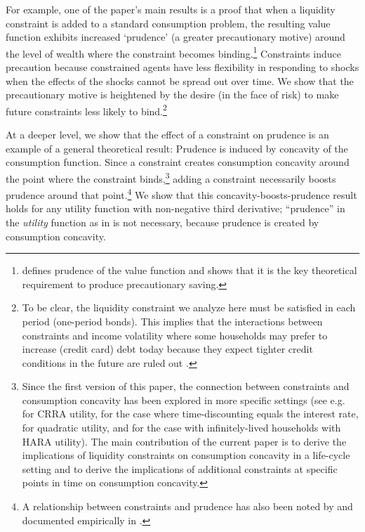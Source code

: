 \documentclass[titlepage]{\econtex}
\begin{document}
  For example, one of the paper's main results is a proof that when a liquidity constraint is added to a standard consumption problem, the resulting value function exhibits increased `prudence' (a greater precautionary motive) around the level of wealth where the constraint becomes binding.\footnote{\citet{kimball:smallandlarge} defines prudence of the value function and shows that it is the key theoretical requirement to produce precautionary saving.} Constraints induce precaution because constrained agents have less flexibility in responding to shocks when the effects of the shocks cannot be spread out over time. We show that the precautionary motive is heightened by the desire (in the face of risk) to make future constraints less likely to bind.\footnote{To be clear, the liquidity constraint we analyze here must be satisfied in each period (one-period bonds). This implies that the interactions between constraints and income volatility where some households may prefer to increase (credit card) debt today because they expect tighter credit conditions in the future are ruled out \citep{fulford2015important,druedahl2018precautionary}.} 

  At a deeper level, we show that the effect of a constraint on prudence is an example of a general theoretical result: Prudence is induced by concavity of the consumption function. Since a constraint creates consumption concavity around the point where the constraint binds,\footnote{Since the first version of this paper, the connection between constraints and consumption concavity has been explored in more specific settings (see e.g. \citet{park2006analytical} for CRRA utility,  \citet{seater1997optimal} for the case where time-discounting equals the interest rate, \citet{nishiyama2012concavity} for quadratic utility, and \citet{holm2018consumption} for the case with infinitely-lived households with HARA utility). The main contribution of the current paper is to derive the implications of liquidity constraints on consumption concavity in a life-cycle setting and to derive the implications of additional constraints at specific points in time on consumption concavity.} adding a constraint necessarily boosts prudence around that point.\footnote{A relationship between constraints and prudence has also been noted by \citet{lee2007degree} and documented empirically in \citet{lee2010precautionary}.} We show that this concavity-boosts-prudence result holds for any utility function with non-negative third derivative; ``prudence'' in the \textit{utility} function as in  \citet{kimball:smallandlarge} is not necessary, because prudence is created by consumption concavity.
\end{document}
